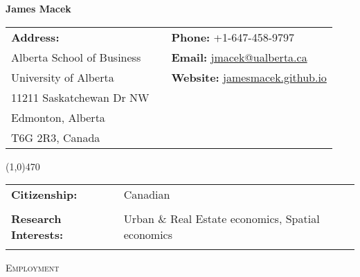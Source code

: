 \documentclass[11pt]{amsart}
\author{}
\begin{document}
\pagestyle{empty}
\setlength\parindent{0pt}

\Huge
\hspace*{\fill} \textbf{James Macek} \hspace*{\fill}
\normalsize
\vspace{1cm}

 \begin{tabular}{p{5cm} p{1cm} p{10cm}}
 \textbf{Address:}       &  & \textbf{Phone:} +1-647-458-9797                                                                                        \\
 Alberta School of Business &  & \textbf{Email:} \href{mailto:jmacek@ualberta.ca}{jmacek@ualberta.ca}                         \\
 University of Alberta  &  & \textbf{Website:} \href{https://jamesmacek.github.io}{jamesmacek.github.io}  \\
11211 Saskatchewan Dr NW       &  &                                                                                                                        \\
Edmonton, Alberta        &  &                                                                                                                        \\
T6G 2R3, Canada          &  &                                                                                                                        
\end{tabular}

\line(1,0){470}


 \begin{tabular}{ p{4cm}  p{15cm}}
 \textbf{Citizenship:}           & Canadian                                     \\
                                 &                                              \\
\textbf{Research Interests:}     & Urban \& Real Estate economics, Spatial economics  \\ 
                                 &                                           \\
\end{tabular}



\vspace{0.4cm}





\LARGE
\textsc{Employment}
\vspace{0.2cm}
\end{document}
